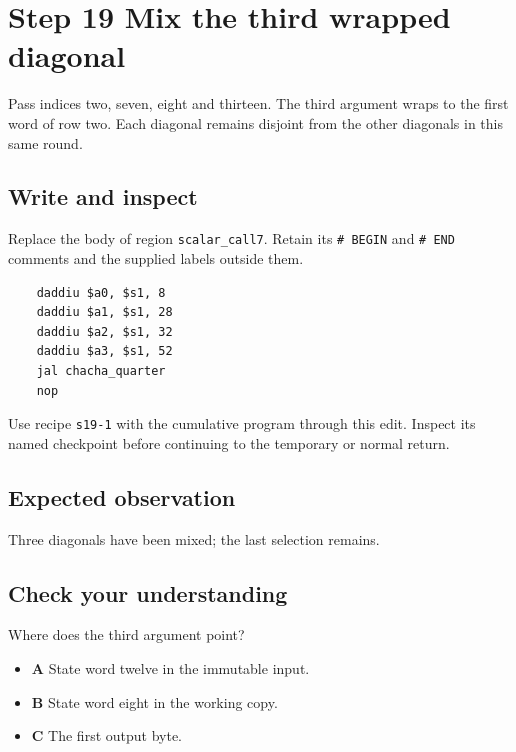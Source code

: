 \section{Step 19 Mix the third wrapped diagonal}\label{chacha-s19}

Pass indices two, seven, eight and thirteen. The third argument wraps to the first word of row two. Each diagonal remains disjoint from the other diagonals in this same round.

\subsection{Write and inspect}
Replace the body of region \texttt{scalar\_call7}. Retain its \texttt{\# BEGIN} and \texttt{\# END} comments and the supplied labels outside them.

\begin{verbatim}
    daddiu $a0, $s1, 8
    daddiu $a1, $s1, 28
    daddiu $a2, $s1, 32
    daddiu $a3, $s1, 52
    jal chacha_quarter
    nop
\end{verbatim}

Use recipe \texttt{s19-1} with the cumulative program through this edit. Inspect its named checkpoint before continuing to the temporary or normal return.

\subsection{Expected observation}
Three diagonals have been mixed; the last selection remains.

\subsection{Check your understanding}
Where does the third argument point?

\begin{itemize}
  \item \textbf{A} State word twelve in the immutable input.
  \item \textbf{B} State word eight in the working copy.
  \item \textbf{C} The first output byte.
\end{itemize}
